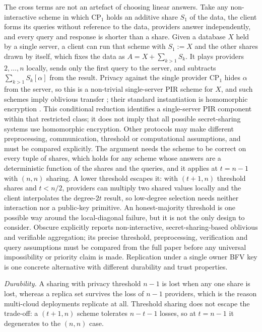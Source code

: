 \documentclass[a4paper,fleqn]{cas-sc}
\begin{document}
The cross terms are not an artefact of choosing linear answers. Take any
non-interactive scheme in which $\text{CP}_1$ holds an additive share $S_1$ of
the data, the client forms its queries without reference to the data,
providers answer independently, and every query and response is shorter than a
share. Given a database $X$ held by a single server, a client
can run that scheme with $S_1:=X$ and the other shares drawn by itself, which
fixes the data as $A=X+\sum_{k>1}S_k$. It plays providers $2,\dots,n$ locally,
sends only the first query to the server, and subtracts $\sum_{k>1}S_k[\alpha]$
from the result. Privacy against the single provider $\text{CP}_1$ hides
$\alpha$ from the server, so this is a non-trivial single-server PIR scheme for
$X$, and such schemes imply oblivious transfer \citep{dicrescenzo2000single};
their standard instantiation is homomorphic encryption
\citep{kushilevitz1997replication}. This conditional reduction identifies a single-server PIR component
within that restricted class; it does not imply that all possible
secret-sharing systems use homomorphic encryption. Other protocols may
make different preprocessing, communication, threshold or computational
assumptions, and must be compared explicitly. The argument needs the
scheme to be correct on every tuple of shares, which holds for any scheme whose
answers are a deterministic function of the shares and the queries, and it
applies at $t=n-1$ with $(n,n)$ sharing. A lower threshold escapes it: with
$(t{+}1,n)$ threshold shares and $t<n/2$, providers can multiply two shared
values locally and the client interpolates the degree-$2t$ result, so
low-degree selection needs neither interaction nor a public-key primitive. An honest-majority threshold is one possible way around the local-diagonal
failure, but it is not the only design to consider. Obscure
\citep{gupta2020obscure} explicitly reports non-interactive,
secret-sharing-based oblivious and verifiable aggregation; its precise
threshold, preprocessing, verification and query assumptions must be
compared from the full paper before any universal impossibility or
priority claim is made. Replication under a single owner BFV key is
one concrete alternative with different durability and trust properties.

\emph{Durability.} A sharing with privacy threshold $n-1$ is lost when any one
share is lost, whereas a replica set survives the loss of $n-1$ providers,
which is the reason multi-cloud deployments replicate at all. Threshold
sharing does not escape the trade-off: a $(t{+}1,n)$ scheme tolerates
$n-t-1$ losses, so at $t=n-1$ it degenerates to the $(n,n)$ case.
\end{document}
